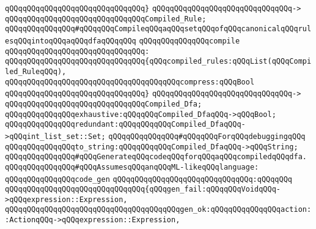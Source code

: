 \verb|qQQqqQQqqQQqqQQqqQQqqQQqqQQqqQQq}|\newline
\verb|qQQqqQQqqQQqqQQqqQQqqQQqqQQqqQQq->|\newline
\verb|qQQqqQQqqQQqqQQqqQQqqQQqqQQqqQQqCompiled_Rule;|\newline
\newline
\newline
\verb|qQQqqQQqqQQqqQQq#qQQqqQQqCompileqQQqaqQQqsetqQQqofqQQqcanonicalqQQqrulesqQQqintoqQQqaqQQqdfaqQQqqQQq|\newline
\verb|qQQqqQQqqQQqqQQqcompile|\newline
\verb|qQQqqQQqqQQqqQQqqQQqqQQqqQQqqQQq:|\newline
\verb|qQQqqQQqqQQqqQQqqQQqqQQqqQQqqQQq{qQQqcompiled_rules:qQQqList(qQQqCompiled_RuleqQQq),|\newline
\verb|qQQqqQQqqQQqqQQqqQQqqQQqqQQqqQQqqQQqqQQqcompress:qQQqBool|\newline
\verb|qQQqqQQqqQQqqQQqqQQqqQQqqQQqqQQq}|\newline
\verb|qQQqqQQqqQQqqQQqqQQqqQQqqQQqqQQq->|\newline
\verb|qQQqqQQqqQQqqQQqqQQqqQQqqQQqqQQqCompiled_Dfa;|\newline
\newline
\verb|qQQqqQQqqQQqqQQqexhaustive:qQQqqQQqCompiled_DfaqQQq->qQQqBool;|\newline
\verb|qQQqqQQqqQQqqQQqredundant:qQQqqQQqqQQqCompiled_DfaqQQq->qQQqint_list_set::Set;|\newline
\newline
\verb|qQQqqQQqqQQqqQQq#qQQqqQQqForqQQqdebuggingqQQq|\newline
\verb|qQQqqQQqqQQqqQQqto_string:qQQqqQQqqQQqCompiled_DfaqQQq->qQQqString;|\newline
\newline
\newline
\verb|qQQqqQQqqQQqqQQq#qQQqGenerateqQQqcodeqQQqforqQQqaqQQqcompiledqQQqdfa.|\newline
\verb|qQQqqQQqqQQqqQQq#qQQqAssumesqQQqanqQQqML-likeqQQqlanguage:|\newline
\newline
\verb|qQQqqQQqqQQqqQQqcode_gen|\newline
\verb|qQQqqQQqqQQqqQQqqQQqqQQqqQQqqQQq:qQQqqQQq|\newline
\verb|qQQqqQQqqQQqqQQqqQQqqQQqqQQqqQQq{qQQqgen_fail:qQQqqQQqVoidqQQq->qQQqexpression::Expression,|\newline
\verb|qQQqqQQqqQQqqQQqqQQqqQQqqQQqqQQqqQQqqQQqgen_ok:qQQqqQQqqQQqqQQqaction::ActionqQQq->qQQqexpression::Expression,|\newline
